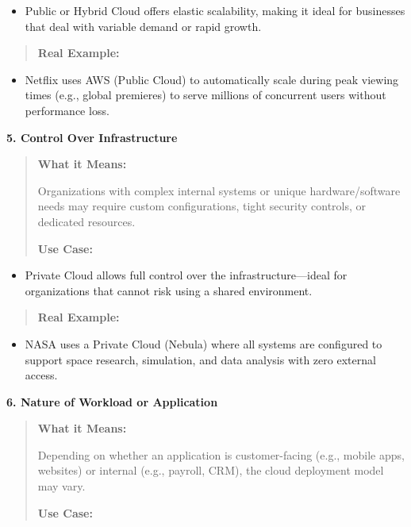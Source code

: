 \documentclass[12pt]{article}
\begin{document}
\begin{itemize}
\item
  Public or Hybrid Cloud offers elastic scalability, making it ideal for
  businesses that deal with variable demand or rapid growth.
\end{itemize}

\begin{quote}
\textbf{Real Example:}
\end{quote}

\begin{itemize}
\item
  Netflix uses AWS (Public Cloud) to automatically scale during peak
  viewing times (e.g., global premieres) to serve millions of concurrent
  users without performance loss.
\end{itemize}

\textbf{5. Control Over Infrastructure}

\begin{quote}
\textbf{What it Means:}

Organizations with complex internal systems or unique hardware/software
needs may require custom configurations, tight security controls, or
dedicated resources.

\textbf{Use Case:}
\end{quote}

\begin{itemize}
\item
  Private Cloud allows full control over the infrastructure---ideal for
  organizations that cannot risk using a shared environment.
\end{itemize}

\begin{quote}
\textbf{Real Example:}
\end{quote}

\begin{itemize}
\item
  NASA uses a Private Cloud (Nebula) where all systems are configured to
  support space research, simulation, and data analysis with zero
  external access.
\end{itemize}

\textbf{6. Nature of Workload or Application}

\begin{quote}
\textbf{What it Means:}

Depending on whether an application is customer-facing (e.g., mobile
apps, websites) or internal (e.g., payroll, CRM), the cloud deployment
model may vary.

\textbf{Use Case:}
\end{quote}
\end{document}
